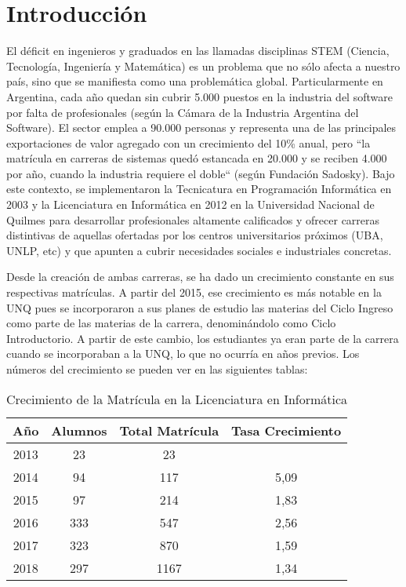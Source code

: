 \chapter{Introducción}
\label{sec:introduccion}


El déficit en ingenieros y graduados en las llamadas disciplinas STEM (Ciencia, Tecnología, Ingeniería y Matemática) es un problema que no sólo afecta a nuestro país, sino que se manifiesta como una problemática global. Particularmente en Argentina, cada año quedan sin cubrir 5.000 puestos en la industria del software por falta de profesionales (según la Cámara de la Industria Argentina del Software). El sector emplea a 90.000 personas y representa una de las principales exportaciones de valor agregado con un crecimiento del 10\% anual, pero “la matrícula en carreras de sistemas quedó estancada en 20.000 y se reciben 4.000 por año, cuando la industria requiere el doble“ (según Fundación Sadosky).
Bajo este contexto, se implementaron la Tecnicatura en Programación Informática en 2003 y la Licenciatura en Informática en 2012 en la Universidad Nacional de Quilmes para desarrollar profesionales altamente calificados y ofrecer carreras distintivas de aquellas ofertadas por los centros universitarios próximos (UBA, UNLP, etc) y que apunten a cubrir necesidades sociales e industriales concretas.
 
Desde la creación de ambas carreras, se ha dado un crecimiento constante  en sus respectivas matrículas. A partir del 2015, ese crecimiento es más notable en la UNQ pues se incorporaron a sus planes de estudio las materias del Ciclo Ingreso como parte de las materias de la carrera, denominándolo como Ciclo Introductorio. A partir de este cambio, los estudiantes ya eran parte de la carrera cuando se incorporaban a la UNQ, lo que no ocurría en años previos. Los números del crecimiento se pueden ver en las siguientes tablas:


\begin{table}[!htbp]
    \centering
    \begin{tabular}{|c|c|c|c|}
    \hline
    Año & Alumnos & Total Matrícula & Tasa Crecimiento \\
    \hline
    2013 & 23 & 23 & \\
    \hline
    2014 & 94 & 117 & 5,09 \\ 
    \hline
    2015 & 97 & 214 & 1,83 \\
    \hline
    2016 & 333 & 547 & 2,56 \\
    \hline
    2017 & 323 & 870 & 1,59 \\ 
    \hline
    2018 & 297 & 1167 & 1,34 \\ 
    \hline
    \end{tabular}
    \caption{Crecimiento de la Matrícula en la Licenciatura en Informática}
    \label{tab:tabla_planes}
\end{table}



